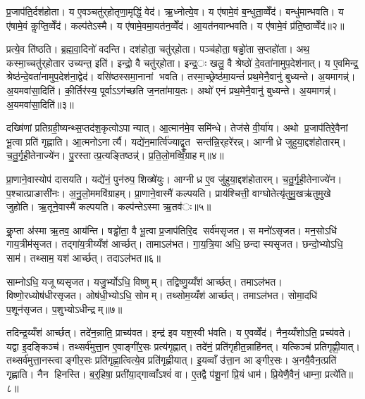 प्र॒जाप॑ति॒र्दश॑होता। य ए॒वञ्चतु॑र्‌होतृणा॒मृद्धिं॒ वेद॑। ऋ॒ध्नोत्ये॒व। य ए॑षामे॒वं ब॒न्धुता॒व्वेँद॑। बन्धु॑मान्भवति। य ए॑षामे॒वं कॢप्ति॒व्वेँद॑। कल्प॑तेऽस्मै। य ए॑षामे॒वमा॒यत॑न॒व्वेँद॑। आ॒यत॑नवान्भवति। य ए॑षामे॒वं प्र॑ति॒ष्ठाव्वेँद॑॥२॥

प्रत्ये॒व ति॑ष्ठति। ब्र॒ह्म॒वा॒दिनो॑ वदन्ति। दश॑होता॒ चतु॑र्‌होता। पञ्च॑होता॒ षड्ढो॑ता स॒प्तहो॑ता। अथ॒ कस्मा॒च्चतु॑र्‌होतार उच्यन्त॒ इति॑। इन्द्रो॒ वै चतु॑र्‌होता। इन्द्र॒ः खलु॒ वै श्रेष्ठो॑ दे॒वता॑नामुप॒देश॑नात्। य ए॒वमिन्द्र॒ श्रेष्ठ॑न्दे॒वता॑नामुप॒देश॑ना॒द्वेद॑। वसि॑ष्ठस्समा॒नानां भवति। तस्मा॒च्छ्रेष्ठ॑मा॒यन्तं॑ प्रथ॒मेनै॒वानु॑ बुध्यन्ते। अ॒यमागन्न्॑। अ॒यमवा॑सा॒दिति॑। की॒र्तिर॑स्य॒ पूर्वाऽऽग॑च्छति ज॒नता॑माय॒तः। अथो॑ एनं प्रथ॒मेनै॒वानु॑ बुध्यन्ते। अ॒यमागन्न्॑। अ॒यमवा॑सा॒दिति॑॥३॥


दख्षि॑णां प्रतिग्रही॒ष्यन्थ्स॒प्तद॑श॒कृत्वोऽपान्यात्। आ॒त्मान॑मे॒व समि॑न्धे। तेज॑से वी॒र्या॑य। अथो प्र॒जाप॑तिरे॒वैनां भू॒त्वा प्रति॑ गृह्णाति। आ॒त्मनोऽनार्त्यै। यद्ये॑न॒मार्त्वि॑ज्याद्वृ॒त सन्त॑न्नि॒र्‌हरे॑रन्न्। आग्नीध्रे जुहुया॒द्दश॑होतारम्। च॒तु॒र्गृ॒ही॒तेनाज्ये॑न। पु॒रस्तात्प्र॒त्यङ्तिष्ठन्न्॑। प्र॒ति॒लो॒मव्विँ॒ग्राहम्॥४॥

प्रा॒णाने॒वास्योप॑ दासयति। यद्ये॑नं॒ पुन॑रुप॒ शिख्षे॑युः। आग्नीध्र ए॒व जु॑हुया॒द्दश॑होतारम्। च॒तु॒र्गृ॒ही॒तेनाज्ये॑न। प॒श्चात्प्राङासी॑नः। अ॒नु॒लो॒ममवि॑ग्राहम्। प्रा॒णाने॒वास्मै॑ कल्पयति। प्राय॑श्चित्ती॒ वाग्घोतेत्यृ॑तुमु॒खऋ॑तुमुखे जुहोति। ऋ॒तूने॒वास्मै॑ कल्पयति। कल्प॑न्तेऽस्मा ऋ॒तव॑ः॥५॥

कॢ॒प्ता अ॑स्मा ऋ॒तव॒ आय॑न्ति। षड्ढो॑ता॒ वै भू॒त्वा प्र॒जाप॑तिरि॒द सर्व॑मसृजत। स मनो॑ऽसृजत। मन॒सोऽधि॑ गाय॒त्रीम॑सृजत। तद्गा॑य॒त्रीय्यँश॑ आर्च्छत्। तामाऽल॑भत। गा॒य॒त्रि॒या अधि॒ छन्दास्यसृजत। छन्दो॒भ्योऽधि॒ साम॑। तथ्साम॒ यश॑ आर्च्छत्। तदाऽल॑भत॥६॥

साम्नोऽधि॒ यजूष्यसृजत। यजु॒र्भ्योऽधि॒ विष्णुम्। तद्विष्णु॒य्यँश॑ आर्च्छत्। तमाऽल॑भत। विष्णो॒रध्योष॑धीरसृजत। ओष॑धी॒भ्योऽधि॒ सोमम्। तथ्सोम॒य्यँश॑ आर्च्छत्। तमाऽल॑भत। सोमा॒दधि॑ प॒शून॑सृजत। प॒शुभ्योऽधीन्द्रम्॥७॥

तदिन्द्र॒य्यँश॑ आर्च्छत्। तदे॑न॒न्नाति॒ प्राच्य॑वत। इन्द्र॑ इव यश॒स्वी भ॑वति। य ए॒वव्वेँद॑। नैन॒य्यँशोऽति॒ प्रच्य॑वते। यद्वा इ॒दङ्किञ्च॑। तथ्सर्व॑मुत्ता॒न ए॒वाङ्गी॑र॒सः प्रत्य॑गृह्णात्। तदे॑नं॒ प्रति॑गृहीत॒न्नाहि॑नत्। यत्किञ्च॑ प्रतिगृह्णी॒यात्। तथ्सर्व॑मुत्ता॒नस्त्वाङ्गीर॒सः प्रति॑गृह्णा॒त्वित्ये॒व प्रति॑गृह्णीयात्। इ॒यव्वाँ उ॑त्ता॒न आङ्गीर॒सः। अ॒नयै॒वैन॒त्प्रति॑ गृह्णाति। नैन हिनस्ति। ब॒र्॒हिषा॒ प्रती॑या॒द्गाव्वाँऽश्वं॑ वा। ए॒तद्वै प॑शू॒नां प्रि॒यं धाम॑। प्रि॒येणै॒वैनं॒ धाम्ना॒ प्रत्ये॑ति॥८॥

